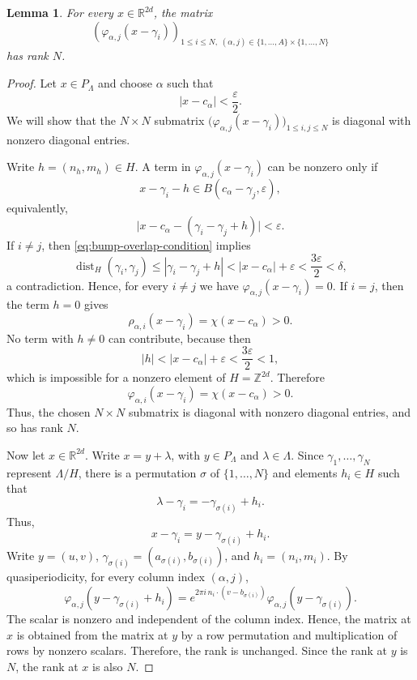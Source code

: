 \documentclass[reqno,a4paper,12pt]{amsart}
\numberwithin{equation}{section}
\newtheorem{lemma}[definition]{Lemma}
\newcommand\1{\mathds{1}}
\begin{document}
\begin{lemma}
For every $x\in\mathbb R^{2d}$, the matrix
$$
\left(
\varphi_{\alpha,j}(x-\gamma_i)
\right)_{
1\leq i\leq N,\;
(\alpha,j)\in\{1,\dots,A\}\times\{1,\dots,N\}
}
$$
has rank $N$.
\end{lemma}

\begin{proof}
Let $x\in P_\Lambda$ and choose $\alpha$ such that
$$
|x-c_\alpha|<\frac{\varepsilon}{2}.
$$
We will show that the $N\times N$ submatrix
$
\bigl(\varphi_{\alpha,j}(x-\gamma_i)\bigr)_{1\leq i,j\leq N}
$
is diagonal with nonzero diagonal entries.

Write $h=(n_h,m_h)\in H$. A term in
$\varphi_{\alpha,j}(x-\gamma_i)$ can be nonzero only if
$$
x-\gamma_i-h
\in
B(c_\alpha-\gamma_j,\varepsilon),
$$
equivalently,
\begin{equation}\label{eq:bump-overlap-condition}
    \bigl|x-c_\alpha-(\gamma_i-\gamma_j+h)\bigr|<\varepsilon.
\end{equation}
If $i\neq j$, then \eqref{eq:bump-overlap-condition} implies
$$
\operatorname{dist}_H(\gamma_i,\gamma_j)
\leq
|\gamma_i-\gamma_j+h|
<
|x-c_\alpha|+\varepsilon
<
\frac{3\varepsilon}{2}
<
\delta,
$$
a contradiction. Hence, for every $i \neq j$ we have
$
\varphi_{\alpha,j}(x-\gamma_i)=0.
$
If $i=j$, then the term $h=0$ gives
$$
\rho_{\alpha,i}(x-\gamma_i)
=
\chi(x-c_\alpha)>0.
$$
No term with $h\neq 0$ can contribute, because then
$$
|h|
<
|x-c_\alpha|+\varepsilon
<
\frac{3\varepsilon}{2}
<
1,
$$
which is impossible for a nonzero element of $H=\mathbb Z^{2d}$. Therefore
$$
\varphi_{\alpha,i}(x-\gamma_i)=\chi(x-c_\alpha)>0.
$$
Thus, the chosen $N\times N$ submatrix is diagonal with nonzero diagonal
entries, and so has rank $N$.

Now let $x\in\mathbb R^{2d}$. Write $x=y+\lambda$, with
$y\in P_\Lambda$ and $\lambda\in\Lambda$. Since
$\gamma_1,\dots,\gamma_N$ represent $\Lambda/H$, there is a permutation
$\sigma$ of $\{1,\dots,N\}$ and elements $h_i\in H$ such that
$$
\lambda-\gamma_i=-\gamma_{\sigma(i)}+h_i.
$$
Thus,
$$
x-\gamma_i
=
y-\gamma_{\sigma(i)}+h_i.
$$
Write $y=(u,v)$, $\gamma_{\sigma(i)}=(a_{\sigma(i)},b_{\sigma(i)})$, and
$h_i=(n_i,m_i)$. By quasiperiodicity, for every column index
$(\alpha,j)$,
$$
\varphi_{\alpha,j}(y-\gamma_{\sigma(i)}+h_i)
=
e^{2\pi i\,n_i\cdot (v-b_{\sigma(i)})}
\varphi_{\alpha,j}(y-\gamma_{\sigma(i)}).
$$
The scalar is nonzero and independent of the column index. Hence, the matrix at
$x$ is obtained from the matrix at $y$ by a row permutation and multiplication
of rows by nonzero scalars. Therefore, the rank is unchanged. Since the rank at
$y$ is $N$, the rank at $x$ is also $N$.
\end{proof}
\end{document}
